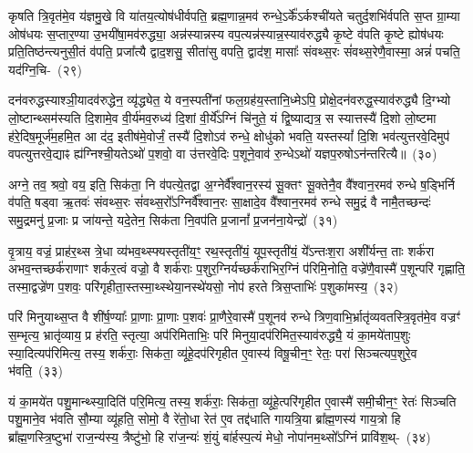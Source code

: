 कृषति त्रि॒वृत॑मे॒व य॑ज्ञमु॒खे वि या॑तय॒त्योष॑धीर्वपति॒ ब्रह्म॒णान्न॒मव॑ रुन्धे॒\-ऽर्के᳚\-ऽर्कश्ची॑यते चतुर्द॒शभि॑र्वपति स॒प्त ग्रा॒म्या ओष॑धयः स॒प्तार॒ण्या उ॒भयी॑षा॒मव॑रुद्ध्या॒ अन्न॑स्यान्नस्य वप॒त्यन्न॑स्यान्न॒स्याव॑रुद्ध्यै कृ॒ष्टे व॑पति कृ॒ष्टे ह्योष॑धयः प्रति॒तिष्ठ॑न्त्यनुसी॒तं व॑पति॒ प्रजा᳚त्यै द्वाद॒शसु॒ सीता॑सु वपति॒ द्वाद॑श॒ मासाः᳚ संवथ्स॒रः सं॑वथ्स॒रेणै॒वास्मा॒ अन्नं॑ पचति॒ यद॑ग्नि॒चि-~(२९)\ip

दन॑वरुद्धस्याश्ञी॒यादव॑रुद्धेन॒ व्यृ॑द्ध्येत॒ ये वन॒स्पती॑नां फल॒ग्रह॑य॒स्तानि॒ध्मे\-ऽपि॒ प्रोक्षे॒दन॑वरुद्ध॒स्याव॑रुद्ध्यै दि॒ग्भ्यो लो॒ष्टान्थ्सम॑स्यति दि॒शामे॒व वी॒र्य॑मव॒रुध्य॑ दि॒शां वी॒र्ये᳚\-ऽग्निं चि॑नुते॒ यं द्वि॒ष्याद्यत्र॒ स स्यात्तस्यै॑ दि॒शो लो॒ष्टमा ह॑रे॒दिष॒मूर्ज॑म॒हमि॒त आ द॑द॒ इतीष॑मे॒वोर्जं॒ तस्यै॑ दि॒शो\-ऽव॑ रुन्धे॒ क्षोधु॑को भवति॒ यस्तस्यां᳚ दि॒शि भव॑त्युत्तरवे॒दिमुप॑ वपत्युत्तरवे॒द्याꣴ ह्य॑ग्निश्ची॒यते\-ऽथो॑ प॒शवो॒ वा उ॑त्तरवे॒दिः प॒शूने॒वाव॑ रु॒न्धे\-ऽथो॑ यज्ञप॒रुषो\-ऽन॑न्तरित्यै॥~(३०)\ip

{\anuvakamend[{च॒ भ॒व॒त्ये॒ताव॒द्वै पुरु॑षे वी॒र्यं॑ यत्कृ॒ष्टञ्चाकृ॑ष्टं च॒ दिख्सीता॑ अग्नि॒चिदव॒ पञ्च॑विꣳशतिश्च}]}

अग्ने॒ तव॒ श्रवो॒ वय॒ इति॒ सिक॑ता॒ नि व॑पत्ये॒तद्वा अ॒ग्नेर्वै᳚श्वान॒रस्य॑ सू॒क्तꣳ सू॒क्तेनै॒व वै᳚श्वान॒रमव॑ रुन्धे ष॒ड्भिर्नि व॑पति॒ षड्वा ऋ॒तवः॑ संवथ्स॒रः सं॑वथ्स॒रो᳚\-ऽग्निर्वै᳚श्वान॒रः सा॒क्षादे॒व वै᳚श्वान॒रमव॑ रुन्धे समु॒द्रं वै नामै॒तच्छन्दः॑ समु॒द्रमनु॑ प्र॒जाः प्र जा॑यन्ते॒ यदे॒तेन॒ सिक॑ता नि॒वप॑ति प्र॒जानां᳚ प्र॒जन॑ना॒येन्द्रो॑~(३१)\ip

वृ॒त्राय॒ वज्रं॒ प्राह॑र॒थ्स त्रे॒धा व्य॑भव॒थ्स्फ्यस्तृती॑य॒ꣳ॒ रथ॒स्तृती॑यं॒ यूप॒स्तृती॑यं॒ ये᳚\-ऽन्तःश॒रा अशी᳚र्यन्त॒ ताः शर्क॑रा अभव॒न्तच्छर्क॑राणाꣳ शर्कर॒त्वं वज्रो॒ वै शर्क॑राः प॒शुर॒ग्निर्यच्छर्क॑राभिर॒ग्निं प॑रिमि॒नोति॒ वज्रे॑णै॒वास्मै॑ प॒शून्परि॑ गृह्णाति॒ तस्मा॒द्वज्रे॑ण प॒शवः॒ परि॑गृहीता॒स्तस्मा॒थ्स्थेया॒नस्थे॑यसो॒ नोप॑ हरते त्रिस॒प्ताभिः॑ प॒शुका॑मस्य॒~(३२)\ip

परि॑ मिनुयाथ्स॒प्त वै शी॑र्\mbox{}ष॒ण्याः᳚ प्रा॒णाः प्रा॒णाः प॒शवः॑ प्रा॒णैरे॒वास्मै॑ प॒शूनव॑ रुन्धे त्रिण॒वाभि॒\-र्भ्रातृ॑व्यवतस्त्रि॒वृत॑मे॒व वज्रꣳ॑ स॒म्भृत्य॒ भ्रातृ॑व्याय॒ प्र ह॑रति॒ स्तृत्या॒ अप॑रिमिताभिः॒ प\-रि॑ मिनुया॒दप॑रिमित॒स्याव॑रुद्ध्यै॒ यं का॒मये॑ताप॒शुः स्या॒दित्यप॑रिमित्य॒ तस्य॒ शर्क॑राः॒ सिक॑ता॒ व्यू॑हे॒दप॑रिगृहीत ए॒वास्य॑ विषू॒चीन॒ꣳ॒ रेतः॒ परा॑ सिञ्चत्यप॒शुरे॒व भ॑वति॒~(३३)\ip

यं का॒मये॑त पशु॒मान्थ्स्या॒दिति॑ परि॒मित्य॒ तस्य॒ शर्क॑राः॒ सिक॑ता॒ व्यू॑हे॒त्परि॑गृहीत ए॒वास्मै॑ समी॒चीन॒ꣳ॒ रेतः॑ सिञ्चति पशु॒माने॒व भ॑वति सौ॒म्या व्यू॑हति॒ सोमो॒ वै रे॑तो॒धा रेत॑ ए॒व तद्द॑धाति गायत्रि॒या ब्रा᳚ह्म॒णस्य॑ गाय॒त्रो हि ब्रा᳚ह्म॒णस्त्रि॒ष्टुभा॑ राज॒न्य॑स्य॒ त्रैष्टु॑भो॒ हि रा॑ज॒न्यः॑ शं॒युं बा॑र्\mbox{}हस्प॒त्यं मेधो॒ नोपा॑नम॒थ्सो᳚\-ऽग्निं प्रावि॑श॒थ्-~(३४)\ip

